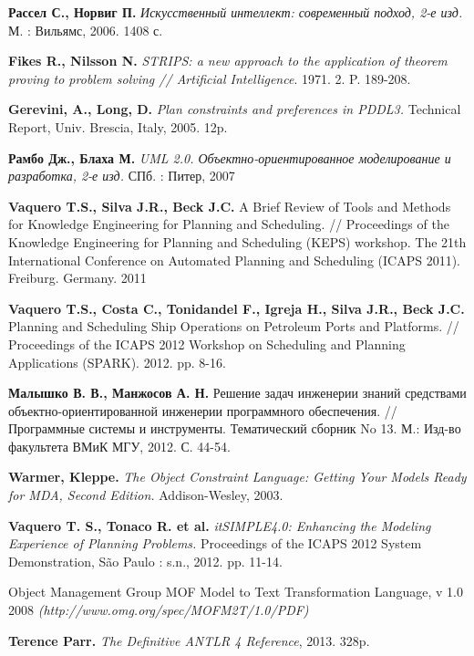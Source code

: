 \documentclass[a4paper,14pt]{extreport}
\begin{document}
\newpage
\begin{thebibliography}{00}

\textbf{Рассел С., Норвиг П.} \textit{Искусственный интеллект: современный подход, 2-е изд.} М. : Вильямс, 2006. 1408 с.

\textbf{Fikes R., Nilsson N.} \textit{STRIPS: a new approach to the application of theorem
proving to problem solving // Artificial Intelligence}. 1971. 2. P. 189-208.

\textbf{Gerevini, A., Long, D.} \textit{Plan constraints and preferences in PDDL3.} Technical Report, Univ. Brescia, Italy, 2005. 12p.

\textbf{Рамбо Дж., Блаха М.} \textit{UML 2.0. Объектно-ориентированное моделирование и разработка, 2-е изд.} СПб. : Питер, 2007

\textbf{Vaquero T.S., Silva J.R., Beck J.C.} A Brief Review of Tools and Methods for Knowledge Engineering for Planning and Scheduling. // Proceedings of the Knowledge Engineering for Planning and Scheduling (KEPS) workshop. The 21th International Conference on Automated Planning and Scheduling (ICAPS 2011). Freiburg. Germany. 2011

\textbf{Vaquero T.S., Costa C., Tonidandel F., Igreja H., Silva J.R., Beck J.C.} Planning and Scheduling Ship Operations on Petroleum Ports and Platforms. // Proceedings of the ICAPS 2012 Workshop on Scheduling and Planning Applications (SPARK). 2012. pp. 8-16.

\textbf{Малышко В. В., Манжосов А. Н.} Решение задач инженерии знаний средствами объектно-ориентированной инженерии программного обеспечения. // Программные системы и инструменты. Тематический сборник No 13. М.: Изд-во факультета ВМиК МГУ, 2012. С. 44-54.


\textbf{Warmer, Kleppe.} \textit{The Object Constraint Language: Getting Your Models Ready for MDA, Second Edition.} Addison-Wesley, 2003.

\textbf{Vaquero T. S., Tonaco R. et al.} \textit{itSIMPLE4.0: Enhancing the Modeling
Experience of Planning Problems.} Proceedings of the ICAPS 2012 System
Demonstration, São Paulo : s.n., 2012. pp. 11-14.

Object Management Group MOF Model to Text Transformation Language, v 1.0 2008 \textit{(http://www.omg.org/spec/MOFM2T/1.0/PDF)}

\textbf{Terence Parr.} \textit{ The Definitive ANTLR 4 Reference}, 2013. 328p.



\end{thebibliography}
\end{document}
